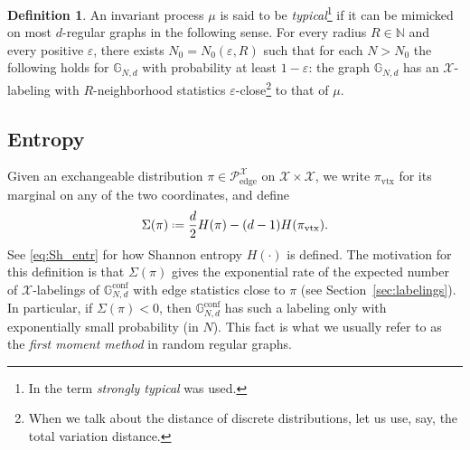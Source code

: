 \documentclass[12pt]{amsart}
\theoremstyle{definition}
\newtheorem{definition}[theorem]{Definition}
\newcommand\Nb{\mathbb{N}}
\newcommand\Gb{\mathbb{G}}
\newcommand\Gbconf{\mathbb{G}^{\textrm{conf}}}
\newcommand\Pcedge{\mathcal{P}_\mathrm{edge}}
\newcommand\Xc{\mathcal{X}}
\newcommand\eps{\varepsilon}
\newcommand\pivtx{\pi_\mathrm{vtx}}
\newcommand{\defeq}{\mathrel{\vcenter{\baselineskip0.5ex \lineskiplimit0pt
                     \hbox{\scriptsize.}\hbox{\scriptsize.}}}%
                     =}
\begin{document}
%
\begin{definition} \label{def:typical}
An invariant process $\mu$ is said to be \emph{typical}\footnote{In \cite[Def 1.1]{backhausz2022typicality} the term \emph{strongly typical} was used.} if it can be mimicked on most $d$-regular graphs in the following sense. For every radius $R \in \Nb$ and every positive $\eps$, there exists $N_0=N_0(\eps,R)$ such that for each $N>N_0$ the following holds for $\Gb_{N,d}$ with probability at least $1-\eps$: the graph $\Gb_{N,d}$ has an $\Xc$-labeling with $R$-neighborhood statistics $\eps$-close\footnote{When we talk about the distance of discrete distributions, let us use, say, the total variation distance.} to that of $\mu$.
\end{definition}

\subsection{Entropy}
%
Given an exchangeable distribution $\pi \in \Pcedge^\Xc$ on $\Xc \times \Xc$, we write $\pivtx$ for its marginal on any of the two coordinates, and define 
%
\begin{equation} \label{eq:pi_entropy}
\Sigma(\pi) \defeq 
\frac{d}{2} H(\pi) - (d-1) H(\pivtx) .
\end{equation}
%
See \eqref{eq:Sh_entr} for how Shannon entropy $H(\cdot)$ is defined. The motivation for this definition is that $\Sigma(\pi)$ gives the exponential rate of the expected number of $\Xc$-labelings of $\Gbconf_{N,d}$ with edge statistics close to $\pi$ (see Section~\ref{sec:labelings}). In particular, if $\Sigma(\pi)<0$, then $\Gbconf_{N,d}$ has such a labeling only with exponentially small probability (in $N$). This fact is what we usually refer to as the \emph{first moment method} in random regular graphs. 
\end{document}
